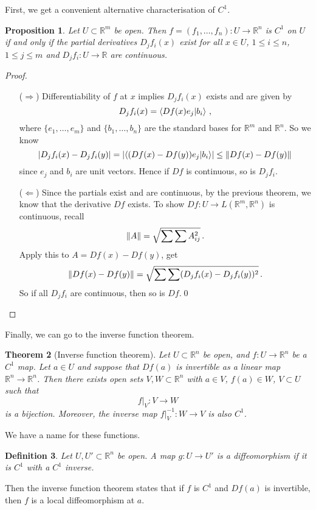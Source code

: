 \documentclass{article}
\theoremstyle{plain}\theoremheaderfont{\normalfont\itshape}\theorembodyfont{\rmfamily}\theoremseparator{.}\newtheorem*{rem}{Remark}\newtheorem*{ex}{Example}\newtheorem*{proof}{Proof}\newtheorem*{altp}{Alternative proof}
\theoremstyle{plain}\theoremheaderfont{\normalfont\bfseries}\theorembodyfont{\rmfamily}\theoremseparator{.}\newtheorem{thm}{Theorem}[section]\newtheorem{lem}[thm]{Lemma}\newtheorem{prop}[thm]{Proposition}\newtheorem*{cor}{Corollary}\newtheorem{defn}[thm]{Definition}\newtheorem{clm}[thm]{Claim}\newtheorem{clminproof}{Claim}
\theoremstyle{break}\theoremheaderfont{\normalfont\itshape}\theorembodyfont{\rmfamily}\theoremseparator{.\medskip}\newtheorem*{proofskip}{Proof}\newtheorem*{exs}{Examples}\newtheorem*{rems}{Remarks}
\theoremstyle{break}\theoremheaderfont{\normalfont\bfseries}\theorembodyfont{\rmfamily}\theoremseparator{.\medskip}\newtheorem{lemskip}[thm]{Lemma}\newtheorem{defnskip}[thm]{Definition}\newtheorem{propskip}[thm]{Proposition}\newtheorem{thmskip}[thm]{Theorem}
\newcommand{\qed}{\hfill\ensuremath{\Box}}
\begin{document}
    First, we get a convenient alternative characterisation of \(C^1\).
    \begin{prop}
        Let \(U\subset\mathbb{R}^m\) be open. Then \(f=(f_1,\dots,f_n):U\to\mathbb{R}^n\) is \(C^1\) on \(U\) if and only if the partial derivatives \(D_jf_i(x)\) exist for all \(x\in U\), \(1\le i\le n\), \(1\le j\le m\) and \(D_jf_i:U\to\mathbb{R}\) are continuous.
    \end{prop}
    \begin{proof}
        \begin{itemize}
            \item[(\(\Rightarrow\))] Differentiability of \(f\) at \(x\) implies \(D_jf_i(x)\) exists and are given by
            \[D_jf_i(x)=\braket{Df(x)e_j}{b_i}\,,\]
            where \(\{e_1,\dots,e_m\}\) and \(\{b_1,\dots,b_n\}\) are the standard bases for \(\mathbb{R}^m\) and \(\mathbb{R}^n\). So we know
            \[\abs{D_jf_i(x)-D_jf_i(y)}=\abs{\braket{(Df(x)-Df(y))e_j}{b_i}}\le\norm{Df(x)-Df(y)}\]
            since \(e_j\) and \(b_i\) are unit vectors. Hence if \(Df\) is continuous, so is \(D_jf_i\).
            \item[(\(\Leftarrow\))] Since the partials exist and are continuous, by the previous theorem, we know that the derivative \(Df\) exists. To show \(Df:U\to L(\mathbb{R}^m,\mathbb{R}^n)\) is continuous, recall
            \[\norm{A}=\sqrt{\sum\sum A_{ij}^2}\,.\]
            Apply this to \(A=Df(x)-Df(y)\), get
            \[\norm{Df(x)-Df(y)}=\sqrt{\sum\sum(D_jf_i(x)-D_jf_i(y))^2}\,.\]
            So if all \(D_jf_i\) are continuous, then so is \(Df\).\qed            
        \end{itemize}
    \end{proof}

    Finally, we can go to the inverse function theorem.

    \begin{thm}[Inverse function theorem]
        Let \(U\subset\mathbb{R}^n\) be open, and \(f:U\to\mathbb{R}^n\) be a \(C^1\) map. Let \(a\in U\) and suppose that \(Df(a)\) is invertible as a linear map \(\mathbb{R}^n\to\mathbb{R}^n\). Then there exists open sets \(V,W\subset\mathbb{R}^n\) with \(a\in V\), \(f(a)\in W\), \(V\subset U\) such that
        \[f|_V:V\to W\]
        is a bijection. Moreover, the inverse map \(f|_{V}^{-1}:W\to V\) is also \(C^1\).
    \end{thm}
    We have a name for these functions.
    \begin{defn}
        Let \(U,U'\subset\mathbb{R}^n\) be open. A map \(g:U\to U'\) is a \textit{diffeomorphism} if it is \(C^1\) with a \(C^1\) inverse.
    \end{defn}
    Then the inverse function theorem states that if \(f\) is \(C^1\) and \(Df(a)\) is invertible, then \(f\) is a local diffeomorphism at \(a\).
\end{document}

